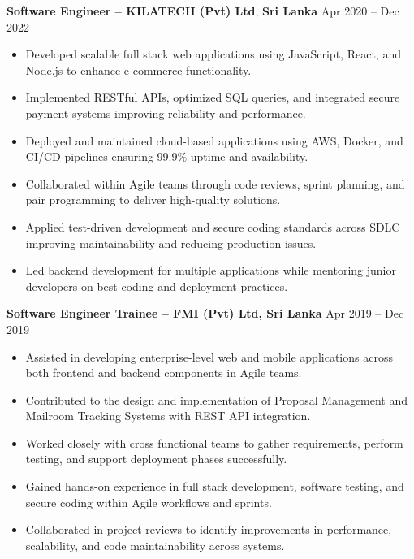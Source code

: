 \documentclass[10pt,letterpaper]{article}
\begin{document}
\vspace{-2pt}

\textbf{Software Engineer -- KILATECH (Pvt) Ltd}, \textbf{Sri Lanka} \hfill Apr 2020 -- Dec 2022

\vspace{-1pt}

\begin{itemize}
\item Developed scalable full stack web applications using JavaScript, React, and Node.js to enhance e-commerce functionality.
\item Implemented RESTful APIs, optimized SQL queries, and integrated secure payment systems improving reliability and performance.
\item Deployed and maintained cloud-based applications using AWS, Docker, and CI/CD pipelines ensuring 99.9\% uptime and availability.
\item Collaborated within Agile teams through code reviews, sprint planning, and pair programming to deliver high-quality solutions.
\item Applied test-driven development and secure coding standards across SDLC improving maintainability and reducing production issues.
\item Led backend development for multiple applications while mentoring junior developers on best coding and deployment practices.
\end{itemize}

\textbf{Software Engineer Trainee -- FMI (Pvt) Ltd, Sri Lanka} \hfill Apr 2019 -- Dec 2019

\vspace{-1pt}

\begin{itemize}
\item Assisted in developing enterprise-level web and mobile applications across both frontend and backend components in Agile teams.
\item Contributed to the design and implementation of Proposal Management and Mailroom Tracking Systems with REST API integration.
\item Worked closely with cross functional teams to gather requirements, perform testing, and support deployment phases successfully.
\item Gained hands-on experience in full stack development, software testing, and secure coding within Agile workflows and sprints.
\item Collaborated in project reviews to identify improvements in performance, scalability, and code maintainability across systems.
\end{itemize}
\end{document}
